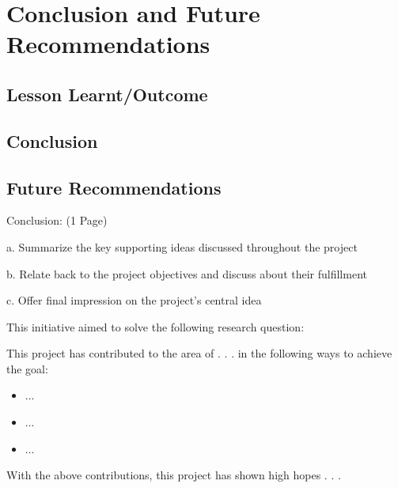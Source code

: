 \chapter{Conclusion and Future Recommendations}
\section{Lesson Learnt/Outcome}
\section{Conclusion}
\section{Future Recommendations}

Conclusion: (1 Page)

a. Summarize the key supporting ideas discussed throughout the project

b. Relate back to the project objectives and discuss about their fulfillment

c. Offer final impression on the project's central idea


This initiative aimed to solve the following research question:


This project has contributed to the area of . . .  in the following ways to achieve the goal:

\begin{itemize}
    \item ...

    \item ...
    
    \item ...
    
\end{itemize}

With the above contributions,  this project has shown high hopes . . .
